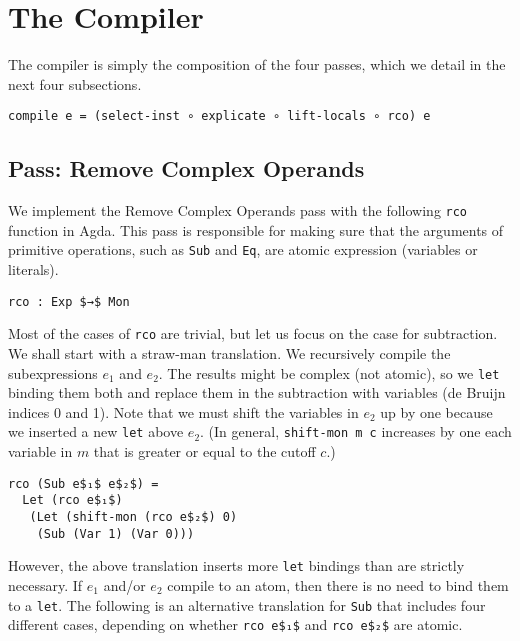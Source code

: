 \documentclass[sigplan,review,dvipsnames,screen,10pt]{acmart}
\begin{document}
\section{The Compiler}
\label{sec:compiler}

The compiler is simply the composition of the four passes,
which we detail in the next four subsections.

\begin{lstlisting}
compile e = (select-inst ∘ explicate ∘ lift-locals ∘ rco) e
\end{lstlisting}


\subsection{Pass: Remove Complex Operands}

We implement the Remove Complex Operands pass with the following
\lstinline{rco} function in Agda. This pass is responsible for making
sure that the arguments of primitive operations, such as
\lstinline{Sub} and \lstinline{Eq}, are atomic expression (variables
or literals).

\begin{lstlisting}
rco : Exp $→$ Mon
\end{lstlisting}

Most of the cases of \lstinline{rco} are trivial, but let us focus on
the case for subtraction. We shall start with a straw-man
translation. We recursively compile the subexpressions $e_1$ and
$e_2$. The results might be complex (not atomic), so we
\lstinline{let} binding them both and replace them in the subtraction
with variables (de Bruijn indices 0 and 1). Note that we must shift
the variables in $e_2$ up by one because we inserted a new
\lstinline{let} above $e_2$. (In general, \lstinline{shift-mon m c}
increases by one each variable in $m$ that is greater or equal to the
cutoff $c$.)

\begin{lstlisting}
rco (Sub e$₁$ e$₂$) =
  Let (rco e$₁$)
   (Let (shift-mon (rco e$₂$) 0)
    (Sub (Var 1) (Var 0)))
\end{lstlisting}

However, the above translation inserts more \lstinline{let} bindings
than are strictly necessary. If $e_1$ and/or $e_2$ compile to an atom,
then there is no need to bind them to a \lstinline{let}.  The
following is an alternative translation for \lstinline{Sub} that
includes four different cases, depending on whether \lstinline{rco e$₁$}
and \lstinline{rco e$₂$} are atomic.
\end{document}
